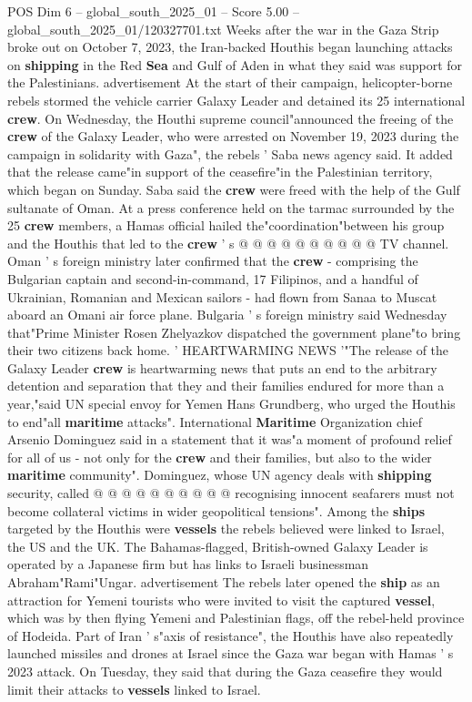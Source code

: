 \begin{textsample}{POS Dim 6 – global\_south\_2025\_01 – Score 5.00 – global\_south\_2025\_01/120327701.txt}  \label{ex:f6_pos_438}
Weeks after the war in the Gaza Strip broke out on October 7, 2023, the Iran-backed Houthis began launching attacks on \textbf{shipping} in the Red \textbf{Sea} and Gulf of Aden in what they said was support for the Palestinians. advertisement At the start of their campaign, helicopter-borne rebels stormed the vehicle carrier Galaxy Leader and detained its 25 international \textbf{crew}.
On Wednesday, the Houthi supreme council"announced the freeing of the \textbf{crew} of the Galaxy Leader, who were arrested on November 19, 2023 during the campaign in solidarity with Gaza", the rebels ' Saba news agency said.
It added that the release came"in support of the ceasefire"in the Palestinian territory, which began on Sunday.
Saba said the \textbf{crew} were freed with the help of the Gulf sultanate of Oman.
At a press conference held on the tarmac surrounded by the 25 \textbf{crew} members, a Hamas official hailed the"coordination"between his group and the Houthis that led to the \textbf{crew} ' s @ @ @ @ @ @ @ @ @ @ TV channel.
Oman ' s foreign ministry later confirmed that the \textbf{crew} - comprising the Bulgarian captain and second-in-command, 17 Filipinos, and a handful of Ukrainian, Romanian and Mexican sailors - had flown from Sanaa to Muscat aboard an Omani air force plane.
Bulgaria ' s foreign ministry said Wednesday that"Prime Minister Rosen Zhelyazkov dispatched the government plane"to bring their two citizens back home. ' HEARTWARMING NEWS '"The release of the Galaxy Leader \textbf{crew} is heartwarming news that puts an end to the arbitrary detention and separation that they and their families endured for more than a year,"said UN special envoy for Yemen Hans Grundberg, who urged the Houthis to end"all \textbf{maritime} attacks".
International \textbf{Maritime} Organization chief Arsenio Dominguez said in a statement that it was"a moment of profound relief for all of us - not only for the \textbf{crew} and their families, but also to the wider \textbf{maritime} community".
Dominguez, whose UN agency deals with \textbf{shipping} security, called @ @ @ @ @ @ @ @ @ @ recognising innocent seafarers must not become collateral victims in wider geopolitical tensions".
Among the \textbf{ships} targeted by the Houthis were \textbf{vessels} the rebels believed were linked to Israel, the US and the UK.
The Bahamas-flagged, British-owned Galaxy Leader is operated by a Japanese firm but has links to Israeli businessman Abraham"Rami"Ungar. advertisement The rebels later opened the \textbf{ship} as an attraction for Yemeni tourists who were invited to visit the captured \textbf{vessel}, which was by then flying Yemeni and Palestinian flags, off the rebel-held province of Hodeida.
Part of Iran ' s"axis of resistance", the Houthis have also repeatedly launched missiles and drones at Israel since the Gaza war began with Hamas ' s 2023 attack.
On Tuesday, they said that during the Gaza ceasefire they would limit their attacks to \textbf{vessels} linked to Israel.

\end{textsample}
